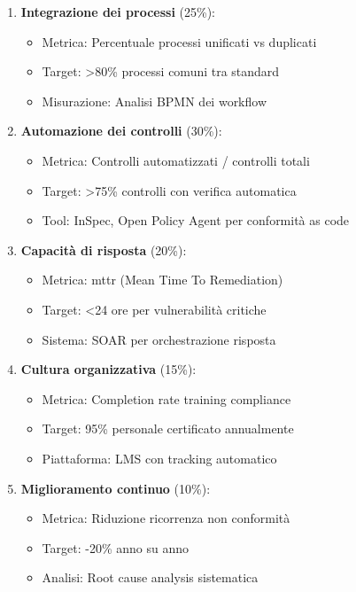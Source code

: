 \begin{enumerate}
    \item \textbf{Integrazione dei processi} (25\%): 
    \begin{itemize}
        \item Metrica: Percentuale processi unificati vs duplicati
        \item Target: >80\% processi comuni tra standard
        \item Misurazione: Analisi BPMN dei workflow
    \end{itemize}
    
    \item \textbf{Automazione dei controlli} (30\%):
    \begin{itemize}
        \item Metrica: Controlli automatizzati / controlli totali
        \item Target: >75\% controlli con verifica automatica
        \item Tool: InSpec, Open Policy Agent per conformità as code
    \end{itemize}
    
    \item \textbf{Capacità di risposta} (20\%):
    \begin{itemize}
        \item Metrica: \gls{mttr} (Mean Time To Remediation)
        \item Target: <24 ore per vulnerabilità critiche
        \item Sistema: SOAR per orchestrazione risposta
    \end{itemize}
    
    \item \textbf{Cultura organizzativa} (15\%):
    \begin{itemize}
        \item Metrica: Completion rate training \gls{compliance}
        \item Target: 95\% personale certificato annualmente
        \item Piattaforma: LMS con tracking automatico
    \end{itemize}
    
    \item \textbf{Miglioramento continuo} (10\%):
    \begin{itemize}
        \item Metrica: Riduzione ricorrenza non conformità
        \item Target: -20\% anno su anno
        \item Analisi: Root cause analysis sistematica
    \end{itemize}
\end{enumerate}

